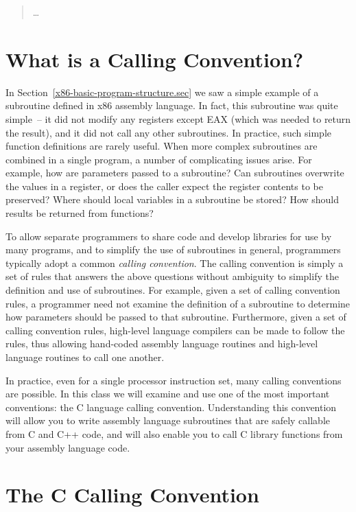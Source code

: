 \begin{quotation}
\ldots
\end{quotation}

\section{What is a Calling Convention?}

In Section~\ref{x86-basic-program-structure.sec} we saw a simple
example of a subroutine defined in x86 assembly language. In fact,
this subroutine was quite simple~-- it did not modify any registers
except EAX (which was needed to return the result), and it did not
call any other subroutines. In practice, such simple function
definitions are rarely useful. When more complex subroutines are
combined in a single program, a number of complicating issues arise.
For example, how are parameters passed to a subroutine? Can
subroutines overwrite the values in a register, or does the caller
expect the register contents to be preserved? Where should local
variables in a subroutine be stored? How should results be returned
from functions?

To allow separate programmers to share code and develop libraries for
use by many programs, and to simplify the use of subroutines in
general, programmers typically adopt a common {\em calling
  convention}. The calling convention is simply a set of rules that
answers the above questions without ambiguity to simplify the
definition and use of subroutines. For example, given a set of calling
convention rules, a programmer need not examine the definition of a
subroutine to determine how parameters should be passed to that
subroutine. Furthermore, given a set of calling convention rules,
high-level language compilers can be made to follow the rules, thus
allowing hand-coded assembly language routines and high-level language
routines to call one another.

In practice, even for a single processor instruction set, many calling
conventions are possible.  In this class we will examine and use one
of the most important conventions: the C language calling convention.
Understanding this convention will allow you to write assembly
language subroutines that are safely callable from C and C++ code, and
will also enable you to call C library functions from your assembly
language code.

\section{The C Calling Convention}

